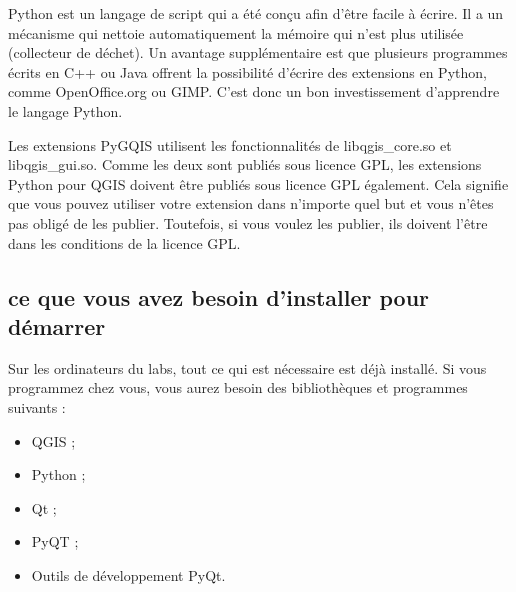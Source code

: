 Python est un langage de script qui a été conçu afin d'être facile à écrire. Il
a un mécanisme qui nettoie automatiquement la mémoire qui n'est plus utilisée
(collecteur de déchet). Un avantage supplémentaire est que plusieurs programmes
écrits en C++ ou Java offrent la possibilité d'écrire des extensions en Python,
comme OpenOffice.org ou GIMP. C'est donc un bon investissement d'apprendre le
langage Python.


Les extensions PyGQIS utilisent les fonctionnalités de libqgis\_core.so et
libqgis\_gui.so. Comme les deux sont publiés sous licence GPL, les extensions
Python pour QGIS doivent être publiés sous licence GPL également. Cela signifie
que vous pouvez utiliser votre extension dans n'importe quel but et vous n'êtes pas
obligé de les publier. Toutefois, si vous voulez les publier, ils doivent l'être
dans les conditions de la licence GPL.

\subsection{ce que vous avez besoin d'installer pour démarrer}


Sur les ordinateurs du labs, tout ce qui est nécessaire est déjà installé. Si
vous programmez chez vous, vous aurez besoin des bibliothèques et programmes
suivants :

\begin{itemize}
\item QGIS ;
\item Python ;
\item Qt ;
\item PyQT ;
\item Outils de développement PyQt.
\end{itemize}

